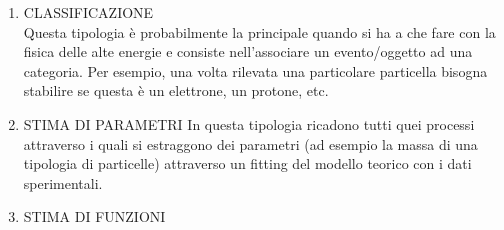 	\begin{enumerate}
		\item CLASSIFICAZIONE \\
			Questa tipologia è probabilmente la principale quando si ha a che fare con la fisica delle alte energie e consiste nell'associare un evento/oggetto  ad una categoria. Per esempio, una volta rilevata una particolare particella bisogna stabilire se questa è un elettrone, un protone, etc.
		\item STIMA DI PARAMETRI
			In questa tipologia ricadono tutti quei processi attraverso i quali si estraggono dei parametri (ad esempio la massa di una tipologia di particelle) attraverso un fitting del modello teorico con i dati sperimentali.
		\item STIMA DI FUNZIONI
			
	\end{enumerate}

%

